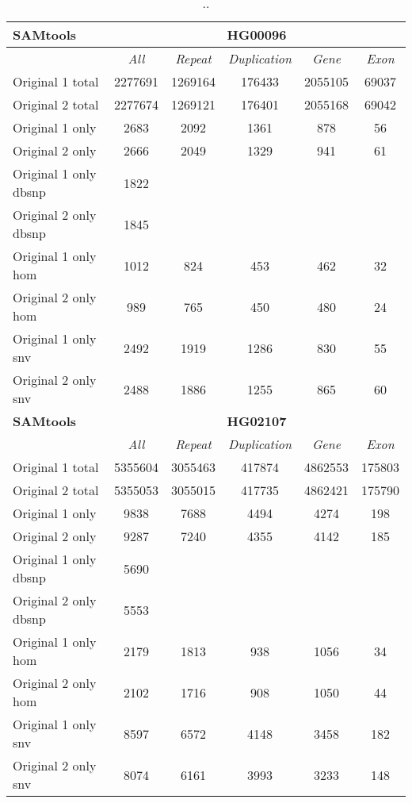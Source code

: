 \begin{table}[htb]
\begin{center}
\begin{tabular}{|l|c||c|c|c|c|}
\hline
{\bf SAMtools} & \multicolumn{5}{|c|}{\bf HG00096} \\
\hline
\cline{2-6}
{\bf} & {\it All} & {\it Repeat} & {\it Duplication} & {\it Gene} & {\it Exon} \\
\hline
Original 1 total & 2277691 & 1269164 & 176433 & 2055105 & 69037\\ 
\hline
Original 2 total & 2277674 & 1269121 & 176401 & 2055168 & 69042\\ 
\hline
Original 1 only & 2683 & 2092 & 1361 & 878 & 56\\ 
\hline
Original 2 only & 2666 & 2049 & 1329 & 941 & 61\\ 
\hline
Original 1 only dbsnp & 1822 &  &  &  & \\ 
\hline
Original 2 only dbsnp & 1845 &  &  &  & \\ 
\hline
Original 1 only hom & 1012 & 824 & 453 & 462 & 32\\ 
\hline
Original 2 only hom & 989 & 765 & 450 & 480 & 24\\ 
\hline
Original 1 only snv & 2492 & 1919 & 1286 & 830 & 55\\ 
\hline
Original 2 only snv & 2488 & 1886 & 1255 & 865 & 60\\ 
\hline
\hline
{\bf SAMtools} & \multicolumn{5}{|c|}{\bf HG02107} \\
\hline
\cline{2-6}
{\bf} & {\it All} & {\it Repeat} & {\it Duplication} & {\it Gene} & {\it Exon} \\
\hline
Original 1 total & 5355604 & 3055463 & 417874 & 4862553 & 175803\\ 
\hline
Original 2 total & 5355053 & 3055015 & 417735 & 4862421 & 175790\\ 
\hline
Original 1 only & 9838 & 7688 & 4494 & 4274 & 198\\ 
\hline
Original 2 only & 9287 & 7240 & 4355 & 4142 & 185\\ 
\hline
Original 1 only dbsnp & 5690 &  &  &  & \\ 
\hline
Original 2 only dbsnp & 5553 &  &  &  & \\ 
\hline
Original 1 only hom & 2179 & 1813 & 938 & 1056 & 34\\ 
\hline
Original 2 only hom & 2102 & 1716 & 908 & 1050 & 44\\ 
\hline
Original 1 only snv & 8597 & 6572 & 4148 & 3458 & 182\\ 
\hline
Original 2 only snv & 8074 & 6161 & 3993 & 3233 & 148\\ 
\hline
\end{tabular}
\end{center}
\caption{ .. }
\label{tab:orig-vs-shuf-samtools}
\end{table}

